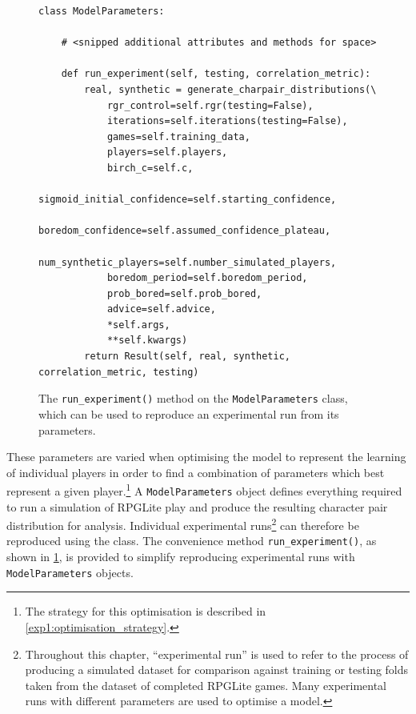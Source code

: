 \begin{figure}
  \begin{center}
    \begin{lstlisting}
class ModelParameters:

    # <snipped additional attributes and methods for space>

    def run_experiment(self, testing, correlation_metric):
        real, synthetic = generate_charpair_distributions(\
            rgr_control=self.rgr(testing=False),
            iterations=self.iterations(testing=False),
            games=self.training_data,
            players=self.players,
            birch_c=self.c,
            sigmoid_initial_confidence=self.starting_confidence,
            boredom_confidence=self.assumed_confidence_plateau,
            num_synthetic_players=self.number_simulated_players,
            boredom_period=self.boredom_period,
            prob_bored=self.prob_bored,
            advice=self.advice,
            *self.args,
            **self.kwargs)
        return Result(self, real, synthetic, correlation_metric, testing)
    \end{lstlisting}
  \end{center}
  \caption{The \lstinline{run_experiment()} method on the
  \lstinline{ModelParameters} class, which can be used to reproduce an
  experimental run from its parameters.}
  \label{fig:ModelParameters_run_experiment_method}
\end{figure}

These parameters are varied when optimising the model to represent the learning
of individual players in order to find a combination of parameters which best
represent a given player.\footnote{The strategy for this optimisation is
described in \cref{exp1:optimisation_strategy}.} A \lstinline{ModelParameters} object defines
everything required to run a simulation of RPGLite play and produce the
resulting character pair distribution for analysis. 
Individual experimental runs\footnote{Throughout this chapter, ``experimental run''
is used to refer to the process of producing a simulated dataset for comparison
against training or testing folds taken from the dataset of completed RPGLite
games. Many experimental runs with different parameters are used to optimise a
model.} can therefore be reproduced using the class. 
The convenience method \lstinline{run_experiment()}, as shown in
\cref{fig:ModelParameters_run_experiment_method}, is provided to simplify
reproducing experimental runs with \lstinline{ModelParameters} objects.


